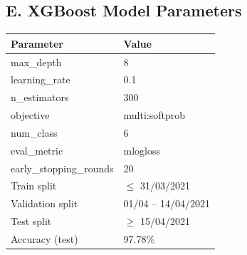 \documentclass[12pt,a4paper]{article}
\begin{document}
\subsection*{E. XGBoost Model Parameters}
\begin{table}[H]
\centering
\begin{tabularx}{0.6\textwidth}{L{4cm}L{3cm}}
\toprule
\textbf{Parameter} & \textbf{Value} \\
\midrule
max\_depth & 8 \\
learning\_rate & 0.1 \\
n\_estimators & 300 \\
objective & multi:softprob \\
num\_class & 6 \\
eval\_metric & mlogloss \\
early\_stopping\_rounds & 20 \\
Train split & $\leq$ 31/03/2021 \\
Validation split & 01/04 -- 14/04/2021 \\
Test split & $\geq$ 15/04/2021 \\
Accuracy (test) & 97.78\% \\
\bottomrule
\end{tabularx}
\end{table}
\end{document}
